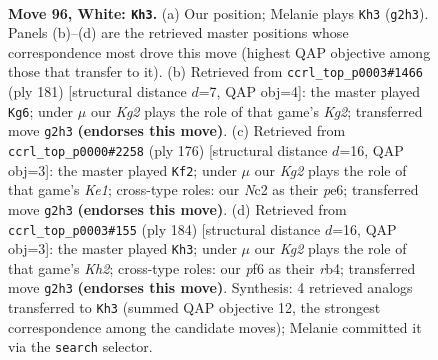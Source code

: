 \documentclass[11pt]{article}
\begin{document}
\clearpage

\begin{figure}[p]\centering
\begin{subfigure}{0.46\textwidth}\centering
\resizebox{\linewidth}{!}{%
\newchessgame
\chessboard[
  setfen={7k/3r2p1/5p2/7p/7P/6P1/1RN3K1/8 w - - 16 96},
  showmover=false,
  pgfstyle=straightmove, color=movearrow, markmove={g2-h3}
]}
\caption{}
\end{subfigure}\hfill
\begin{subfigure}{0.46\textwidth}\centering
\resizebox{\linewidth}{!}{%
\newchessgame
\chessboard[
  setfen={8/5pk1/4p3/4P3/3R1PPK/1r6/8/8 b - - 98 91},
  showmover=false,
  pgfstyle=straightmove, color=movearrow, markmove={g7-g6}
]}
\caption{}
\end{subfigure}
\\[4pt]
\begin{subfigure}{0.46\textwidth}\centering
\resizebox{\linewidth}{!}{%
\newchessgame
\chessboard[
  setfen={3R4/8/2r1pk2/6p1/5pP1/5P2/4P3/4K3 w - - 78 89},
  showmover=false,
  pgfstyle=straightmove, color=movearrow, markmove={e1-f2}
]}
\caption{}
\end{subfigure}\hfill
\begin{subfigure}{0.46\textwidth}\centering
\resizebox{\linewidth}{!}{%
\newchessgame
\chessboard[
  setfen={2R5/8/8/7k/1r3p1p/5P2/6PK/8 w - - 0 93},
  showmover=false,
  pgfstyle=straightmove, color=movearrow, markmove={h2-h3}
]}
\caption{}
\end{subfigure}
\caption{\textbf{Move 96, White: \texttt{Kh3}.} (a) Our position; Melanie plays \texttt{Kh3} (\texttt{g2h3}). Panels (b)--(d) are the retrieved master positions whose correspondence most drove this move (highest QAP objective among those that transfer to it). (b) Retrieved from \texttt{ccrl\_top\_p0003\#1466} (ply 181) [structural distance $d$=7, QAP obj=4]: the master played \texttt{Kg6}; under $\mu$ our \emph{Kg2} plays the role of that game's \emph{Kg2}; transferred move \texttt{g2h3} \textbf{(endorses this move)}. (c) Retrieved from \texttt{ccrl\_top\_p0000\#2258} (ply 176) [structural distance $d$=16, QAP obj=3]: the master played \texttt{Kf2}; under $\mu$ our \emph{Kg2} plays the role of that game's \emph{Ke1}; cross-type roles: our \emph{N}c2 as their \emph{p}e6; transferred move \texttt{g2h3} \textbf{(endorses this move)}. (d) Retrieved from \texttt{ccrl\_top\_p0003\#155} (ply 184) [structural distance $d$=16, QAP obj=3]: the master played \texttt{Kh3}; under $\mu$ our \emph{Kg2} plays the role of that game's \emph{Kh2}; cross-type roles: our \emph{p}f6 as their \emph{r}b4; transferred move \texttt{g2h3} \textbf{(endorses this move)}. Synthesis: 4 retrieved analogs transferred to \texttt{Kh3} (summed QAP objective 12, the strongest correspondence among the candidate moves); Melanie committed it via the \texttt{search} selector.}
\label{fig:thought-m190}
\end{figure}
\end{document}
